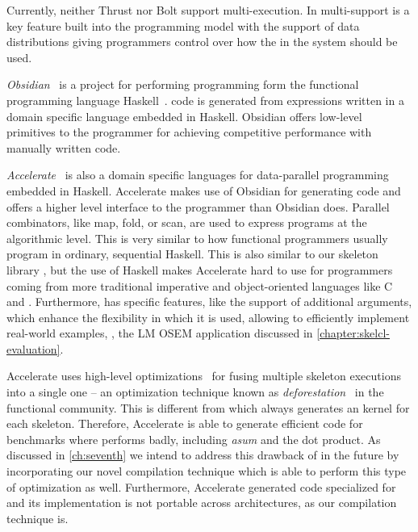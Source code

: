 Currently, neither Thrust nor Bolt support multi-\GPU execution.
In \SkelCL multi-\GPU support is a key feature built into the programming model with the support of data distributions giving programmers control over how the \GPUs in the system should be used.

\bigskip

\emph{Obsidian}~\cite{SvenssonSC08,SvenssonCS10} is a project for performing \GPU programming form the functional programming language Haskell~\cite{HudakPWBFFGHHJKNPP92}.
\GPU code is generated from expressions written in a domain specific language embedded in Haskell.
Obsidian offers low-level primitives to the programmer for achieving competitive performance with manually written \CUDA code.

\bigskip

\emph{Accelerate}~\cite{ChakravartyKLMG11,McDonellCKL13} is also a domain specific languages for data-parallel programming embedded in Haskell.
Accelerate makes use of Obsidian for generating \GPU code and offers a higher level interface to the programmer than Obsidian does.
Parallel combinators, like map, fold, or scan, are used to express programs at the algorithmic level.
This is very similar to how functional programmers usually program in ordinary, sequential Haskell.
This is also similar to our skeleton library \SkelCL, but the use of Haskell makes Accelerate hard to use for programmers coming from more traditional imperative and object-oriented languages like C and \Cpp.
Furthermore, \SkelCL has specific features, like the support of additional arguments, which enhance the flexibility in which it is used, allowing to efficiently implement real-world examples, \eg, the LM OSEM application discussed in \autoref{chapter:skelcl-evaluation}.

Accelerate uses high-level optimizations~\cite{McDonellCKL13} for fusing multiple skeleton executions into a single one -- an optimization technique known as \emph{deforestation}~\cite{Wadler90} in the functional community.
This is different from \SkelCL which always generates an \OpenCL kernel for each skeleton.
Therefore, Accelerate is able to generate efficient code for benchmarks where \SkelCL performs badly, including \emph{asum} and the dot product.
As discussed in \autoref{ch:seventh} we intend to address this drawback of \SkelCL in the future by incorporating our novel compilation technique which is able to perform this type of optimization as well.
Furthermore, Accelerate generated \CUDA code specialized for \GPUs and its implementation is not portable across architectures, as our compilation technique is.

